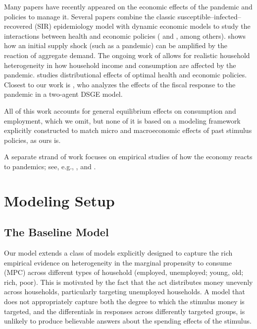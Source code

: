 Many papers have recently appeared on the economic effects of the pandemic and policies to manage it.
Several papers combine the classic susceptible--infected--recovered (SIR) epidemiology model with dynamic economic models to study the interactions between health and economic policies (\cite{ert_covid} and \cite{aal_covid}, among others).
\cite{covidMacroImpl} shows how an initial supply shock (such as a pandemic) can be amplified by the reaction of aggregate demand.
The ongoing work of \cite{kmv_pandemics} allows for realistic household heterogeneity in how household income and consumption are affected by the pandemic.
\cite{healthWealth} studies distributional effects of optimal health and economic policies.
Closest to our work is \cite{faria_FPpandemic}, who analyzes the effects of the fiscal response to the pandemic in a two-agent DSGE model.

All of this work accounts for general equilibrium effects on consumption and employment, which we omit, but none of it is based on a modeling framework explicitly constructed to match micro and macroeconomic effects of past stimulus policies, as ours is.

A separate strand of work focuses on empirical studies of how the economy reacts to pandemics; see, e.g., \cite{baker_Cpandemic}, \cite{jorda_pandemics} and \cite{verner_pandemics}.


\section{Modeling Setup}

\subsection{The Baseline Model}

Our model extends a class of models explicitly designed to capture the rich empirical evidence on heterogeneity in the marginal propensity to consume (MPC) across different types of household (employed, unemployed; young, old; rich, poor).  This is motivated by the fact that the act distributes money unevenly across households, particularly targeting unemployed households.  A model that does not appropriately capture both the degree to which the stimulus money is targeted, and the differentials in responses across differently targeted groups, is unlikely to produce believable answers about the spending effects of the stimulus.

